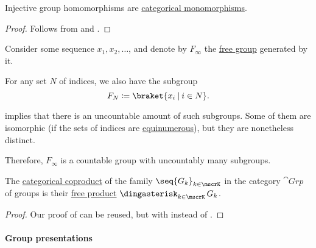 \begin{corollary}\label{thm:injective_group_homomorphisms_are_monomorphisms}
  Injective group homomorphisms are \hyperref[def:morphism_invertibility/left_cancellative]{categorical monomorphisms}.
\end{corollary}
\begin{proof}
  Follows from  and .
\end{proof}

\begin{example}\label{ex:free_group_with_uncountably_many_subgroups}
  Consider some sequence \( x_1, x_2, \ldots \), and denote by \( F_\infty \) the \hyperref[def:free_group]{free group} generated by it.

  For any set \( N \) of indices, we also have the subgroup
  \begin{equation*}
    F_N \coloneqq \braket{ x_i \given i \in N }.
  \end{equation*}

   implies that there is an uncountable amount of such subgroups. Some of them are isomorphic (if the sets of indices are \hyperref[def:equinumerosity]{equinumerous}), but they are nonetheless distinct.

  Therefore, \( F_\infty \) is a countable group with uncountably many subgroups.
\end{example}

\begin{proposition}\label{thm:group_coproduct}
  The \hyperref[def:discrete_category_limits]{categorical coproduct} of the family \( \seq{ G_k }_{k \in \mscrK} \) in the category \hyperref[def:group/category]{\( \cat{Grp} \)} of groups is their \hyperref[def:monoid_free_product]{free product} \( \Ast_{k \in \mscrK} G_k \).
\end{proposition}
\begin{proof}
  Our proof of  can be reused, but with  instead of .
\end{proof}

\paragraph{Group presentations}

